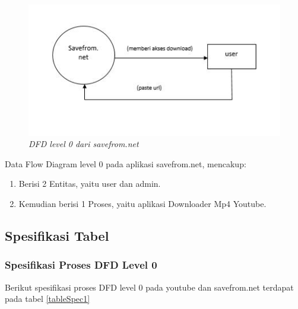 \begin{figure}[!htbp]
    \centering
    \includegraphics[scale=1]{figure/savefrom.jpeg}
    \caption{\textit{DFD level 0 dari savefrom.net}}
    \label{gambar 1}
\end{figure}
\vspace{1cm}
Data Flow Diagram level 0 pada aplikasi savefrom.net, mencakup:
\begin{enumerate}
    \item Berisi 2 Entitas, yaitu user dan admin.
    \item Kemudian berisi 1 Proses, yaitu aplikasi Downloader Mp4 Youtube.
\end{enumerate}

\vspace{8cm}

\subsection{Spesifikasi Tabel}
\subsubsection{Spesifikasi Proses DFD Level 0}

Berikut spesifikasi proses DFD level 0 pada youtube dan savefrom.net terdapat  pada tabel \ref{tableSpec1}

